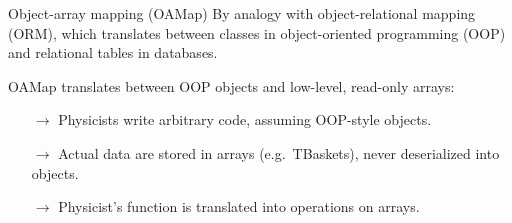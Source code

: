 \documentclass[aspectratio=169]{beamer}
\begin{document}
\begin{frame}{Object-array mapping (OAMap)}
\vspace{0.5 cm}
By analogy with object-relational mapping (ORM), which translates between classes in object-oriented programming (OOP) and relational tables in databases.

\vspace{0.5 cm}
OAMap translates between OOP objects and low-level, read-only arrays:

\vspace{0.2 cm}
\begin{itemize}
\item[$\rightarrow$] Physicists write arbitrary code, assuming OOP-style objects.
\item[$\rightarrow$] Actual data are stored in arrays (e.g.~TBaskets), never deserialized into objects.
\item[$\rightarrow$] Physicist's function is translated into operations on arrays.
\end{itemize}

\vspace{0.2 cm}

\vspace{0.2 cm}
\end{frame}
\end{document}
